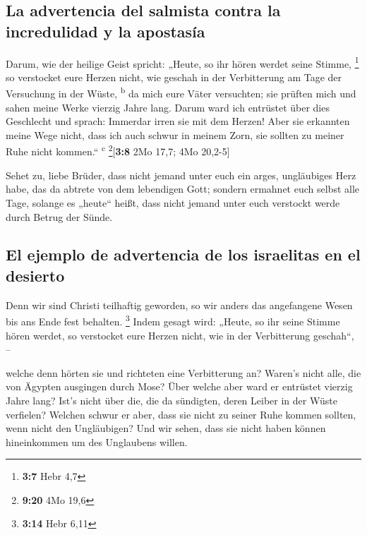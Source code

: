 \hypertarget{la-advertencia-del-salmista-contra-la-incredulidad-y-la-apostasuxeda}{%
\subsection{La advertencia del salmista contra la incredulidad y la
apostasía}\label{la-advertencia-del-salmista-contra-la-incredulidad-y-la-apostasuxeda}}

 Darum, wie der heilige Geist spricht: „Heute, so ihr
hören werdet seine Stimme, \footnote{\textbf{3:7} Hebr 4,7}
 so verstocket eure Herzen nicht, wie geschah in der
Verbitterung am Tage der Versuchung in der Wüste, \textsuperscript{b}
 da mich eure Väter versuchten; sie prüften mich und sahen
meine Werke vierzig Jahre lang.  Darum ward ich entrüstet
über dies Geschlecht und sprach: Immerdar irren sie mit dem Herzen! Aber
sie erkannten meine Wege nicht,  dass ich auch schwur in
meinem Zorn, sie sollten zu meiner Ruhe nicht kommen.``
\textsuperscript{c} \footnote{\textbf{9:20} 4Mo 19,6}{[}\textbf{3:8} 2Mo
17,7; 4Mo 20,2-5{]}

 Sehet zu, liebe Brüder, dass nicht jemand unter euch ein
arges, ungläubiges Herz habe, das da abtrete von dem lebendigen Gott;
 sondern ermahnet euch selbst alle Tage, solange es
„heute`` heißt, dass nicht jemand unter euch verstockt werde durch
Betrug der Sünde.

\hypertarget{el-ejemplo-de-advertencia-de-los-israelitas-en-el-desierto}{%
\subsection{El ejemplo de advertencia de los israelitas en el
desierto}\label{el-ejemplo-de-advertencia-de-los-israelitas-en-el-desierto}}

 Denn wir sind Christi teilhaftig geworden, so wir anders
das angefangene Wesen bis ans Ende fest behalten. \footnote{\textbf{3:14}
  Hebr 6,11}  Indem gesagt wird: „Heute, so ihr seine
Stimme hören werdet, so verstocket eure Herzen nicht, wie in der
Verbitterung geschah``, --

 welche denn hörten sie und richteten eine Verbitterung
an? Waren's nicht alle, die von Ägypten ausgingen durch Mose?
 Über welche aber ward er entrüstet vierzig Jahre lang?
Ist's nicht über die, die da sündigten, deren Leiber in der Wüste
verfielen?  Welchen schwur er aber, dass sie nicht zu
seiner Ruhe kommen sollten, wenn nicht den Ungläubigen? 
Und wir sehen, dass sie nicht haben können hineinkommen um des
Unglaubens willen.

